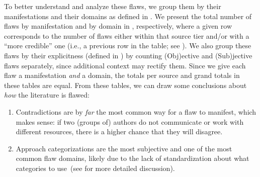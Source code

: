 To better understand and analyze these flaws, we group them by their
manifestations and their domains as defined in .
We present the total number of flaws by manifestation and by domain
in , respectively, where a given
row corresponds to the number of flaws either within that source tier and/or
with a ``more credible'' one (i.e., a previous row in the table; see
). We also group these flaws by their explicitness
(defined in ) by counting (Obj)ective and (Sub)jective flaws
separately, since additional context may rectify them.
Since we give each flaw a manifestation \emph{and} a domain, the totals per
source and grand totals in these tables are equal. From these tables, we can
draw some conclusions about \emph{how} the literature is flawed:
\begin{enumerate}
    \item Contradictions are by \emph{far} the most common way for a flaw to
          manifest, which makes sense: if two (groups of) authors do not
          communicate or work with different resources, there is a higher
          chance that they will disagree.
    \item Approach categorizations are the most subjective and one of the most
          common flaw domains, likely due to the lack of standardization
          about what categories to use\ifnotpaper\ (see 
              for more detailed discussion)\fi.
\end{enumerate}

\ifnotpaper
    

    \begin{landscape}
        \flawMnfstsTable{}
        \flawDmnsTable{}
    \end{landscape}

    
    

\fi

